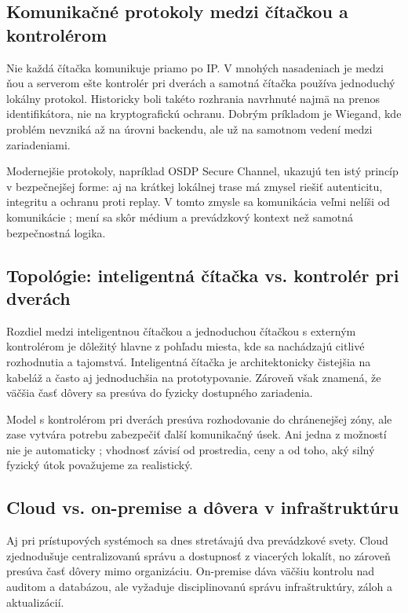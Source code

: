 \documentclass[journal,a4paper,onecolumn]{IEEEtran}
\begin{document}
\subsection{Komunikačné protokoly medzi čítačkou a kontrolérom}

Nie každá čítačka komunikuje priamo po IP. V mnohých nasadeniach je medzi ňou a serverom ešte kontrolér pri dverách a samotná čítačka používa jednoduchý lokálny protokol. Historicky boli takéto rozhrania navrhnuté najmä na prenos identifikátora, nie na kryptografickú ochranu. Dobrým príkladom je Wiegand, kde problém nevzniká až na úrovni backendu, ale už na samotnom vedení medzi zariadeniami.

Modernejšie protokoly, napríklad OSDP Secure Channel, ukazujú ten istý princíp v bezpečnejšej forme: aj na krátkej lokálnej trase má zmysel riešiť autenticitu, integritu a ochranu proti replay. V tomto zmysle sa komunikácia  veľmi nelíši od komunikácie ; mení sa skôr médium a prevádzkový kontext než samotná bezpečnostná logika.

\subsection{Topológie: inteligentná čítačka vs. kontrolér pri dverách}

Rozdiel medzi inteligentnou čítačkou a jednoduchou čítačkou s externým kontrolérom je dôležitý hlavne z pohľadu miesta, kde sa nachádzajú citlivé rozhodnutia a tajomstvá. Inteligentná čítačka je architektonicky čistejšia na kabeláž a často aj jednoduchšia na prototypovanie. Zároveň však znamená, že väčšia časť dôvery sa presúva do fyzicky dostupného zariadenia.

Model s kontrolérom pri dverách presúva rozhodovanie do chránenejšej zóny, ale zase vytvára potrebu zabezpečiť ďalší komunikačný úsek. Ani jedna z možností nie je automaticky ; vhodnosť závisí od prostredia, ceny a od toho, aký silný fyzický útok považujeme za realistický.

\subsection{Cloud vs. on-premise a dôvera v infraštruktúru}

Aj pri prístupových systémoch sa dnes stretávajú dva prevádzkové svety. Cloud zjednodušuje centralizovanú správu a dostupnosť z viacerých lokalít, no zároveň presúva časť dôvery mimo organizáciu. On-premise dáva väčšiu kontrolu nad auditom a databázou, ale vyžaduje disciplinovanú správu infraštruktúry, záloh a aktualizácií.
\end{document}
